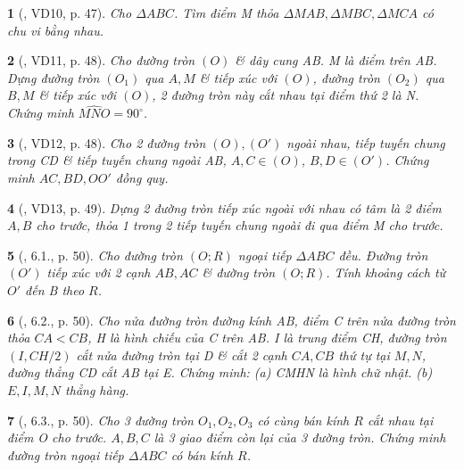 \documentclass{article}
\newtheorem{baitoan}{}
\begin{document}
\begin{baitoan}[\cite{TLCT_THCS_Toan_9_hinh_hoc}, VD10, p. 47]
	Cho $\Delta ABC$. Tìm điểm M thỏa $\Delta MAB,\Delta MBC,\Delta MCA$ có chu vi bằng nhau.
\end{baitoan}

\begin{baitoan}[\cite{TLCT_THCS_Toan_9_hinh_hoc}, VD11, p. 48]
	Cho đường tròn $(O)$ \& dây cung AB. M là điểm trên AB. Dựng đường tròn $(O_1)$ qua $A,M$ \& tiếp xúc với $(O)$, đường tròn $(O_2)$ qua $B,M$ \& tiếp xúc với $(O)$, 2 đường tròn này cắt nhau tại điểm thứ 2 là N. Chứng minh $\widehat{MNO} = 90^\circ$.
\end{baitoan}

\begin{baitoan}[\cite{TLCT_THCS_Toan_9_hinh_hoc}, VD12, p. 48]
	Cho 2 đường tròn $(O),(O')$ ngoài nhau, tiếp tuyến chung trong CD \& tiếp tuyến chung ngoài AB, $A,C\in(O)$, $B,D\in(O')$. Chứng minh $AC,BD,OO'$ đồng quy.
\end{baitoan}

\begin{baitoan}[\cite{TLCT_THCS_Toan_9_hinh_hoc}, VD13, p. 49]
	Dựng 2 đường tròn tiếp xúc ngoài với nhau có tâm là 2 điểm $A,B$ cho trước, thỏa 1 trong 2 tiếp tuyến chung ngoài đi qua điểm M cho trước.
\end{baitoan}

\begin{baitoan}[\cite{TLCT_THCS_Toan_9_hinh_hoc}, 6.1., p. 50]
	Cho đường tròn $(O;R)$ ngoại tiếp $\Delta ABC$ đều. Đường tròn $(O')$ tiếp xúc với 2 cạnh $AB,AC$ \& đường tròn $(O;R)$. Tính khoảng cách từ $O'$ đến B theo $R$.
\end{baitoan}

\begin{baitoan}[\cite{TLCT_THCS_Toan_9_hinh_hoc}, 6.2., p. 50]
	Cho nửa đường tròn đường kính AB, điểm C trên nửa đường tròn thỏa $CA < CB$, H là hình chiếu của C trên AB. I là trung điểm CH, đường tròn $(I,CH/2)$ cắt nửa đường tròn tại D \& cắt 2 cạnh $CA,CB$ thứ tự tại $M,N$, đường thẳng CD cắt AB tại E. Chứng minh: (a) CMHN là hình chữ nhật. (b) $E,I,M,N$ thẳng hàng.
\end{baitoan}

\begin{baitoan}[\cite{TLCT_THCS_Toan_9_hinh_hoc}, 6.3., p. 50]
	Cho 3 đường tròn $O_1,O_2,O_3$ có cùng bán kính $R$ cắt nhau tại điểm O cho trước. $A,B,C$ là 3 giao điểm còn lại của 3 đường tròn. Chứng minh đường tròn ngoại tiếp $\Delta ABC$ có bán kính $R$.
\end{baitoan}
\end{document}
